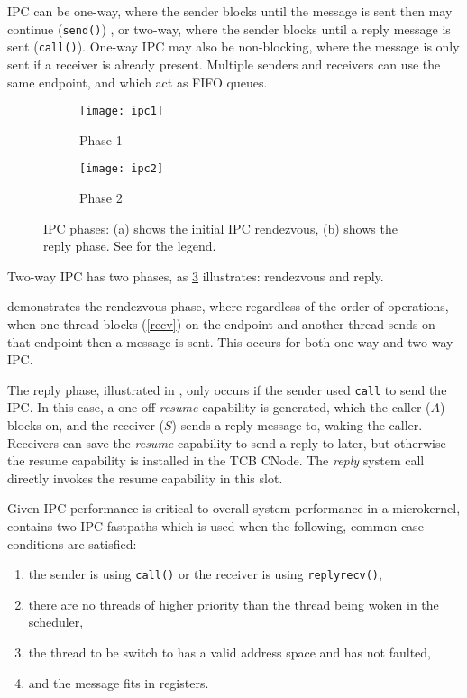 IPC can be one-way, where the sender blocks until the message is sent then may continue
(\texttt{send()}) , or two-way,
where the sender blocks until a reply message is sent (\texttt{call()}). One-way IPC may also be
non-blocking, where the message is only sent if a receiver is already present.
Multiple senders and receivers can use the same endpoint, and which act as \gls{FIFO}
queues. 

\begin{figure}
    \centering
    \begin{subfigure}[h]{0.48\textwidth}
        \centering
        \texttt{[image: ipc1]}
        \caption{Phase 1}
        \label{f:ipc1}
    \end{subfigure}%
    \begin{subfigure}[h]{0.48\textwidth}
        \centering
        \texttt{[image: ipc2]}
        \caption{Phase 2}
        \label{f:ipc2}
    \end{subfigure}
    \label{f:ipc}
    \caption{IPC phases: (a) shows the initial IPC rendezvous, (b) shows the
    reply phase. See  for the legend.}
\end{figure}

Two-way IPC has two phases, as \cref{f:ipc} illustrates: rendezvous and reply.

 demonstrates the rendezvous phase, where regardless of the order of operations, 
when one thread blocks (\cref{recv}) on the endpoint and another thread sends on that endpoint
then a message is sent. This occurs for both one-way and two-way \gls{IPC}.

The reply phase, illustrated in , only occurs if the sender used \texttt{call} to send
the \gls{IPC}. In this case, a one-off \emph{resume} capability is generated, which the caller ($A$)
blocks on, and the receiver ($S$) sends a reply message to, waking the caller. Receivers can save
the \emph{resume} capability to send a reply to later, but otherwise the resume capability is
installed in the \gls{TCB} CNode. The \emph{reply} system call directly invokes the resume
capability in this slot. 

Given \gls{IPC} performance is critical to overall system performance in a microkernel, \selfour
contains two \gls{IPC} fastpaths which is used when the following, common-case conditions are satisfied:

\begin{enumerate}
    \item the sender is using \texttt{call()} or the receiver is using \texttt{replyrecv()},
    \item there are no threads of higher priority than the thread being woken in the scheduler,
    \item the thread to be switch to has a valid address space and has not faulted,
    \item and the message fits in registers.
\end{enumerate}

